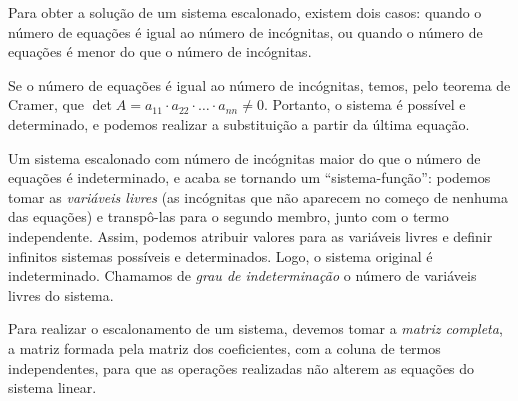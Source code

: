 Para obter a solução de um sistema escalonado, existem dois casos: quando o número de equações é igual ao número de incógnitas, ou quando o número de equações é menor do que o número de incógnitas. \par 
Se o número de equações é igual ao número de incógnitas, temos, pelo teorema de Cramer, que $\det A= a_{11}\cdot a_{22}\cdot \dots \cdot a_{nn} \neq 0$. Portanto, o sistema é possível e determinado, e podemos realizar a substituição a partir da última equação. \par 
Um sistema escalonado com número de incógnitas maior  do que o número de equações é indeterminado, e acaba se tornando um ``sistema-função'': podemos tomar as \emph{variáveis livres} (as incógnitas que não aparecem no começo de nenhuma das equações) e transpô-las para o segundo membro, junto com o termo independente. Assim, podemos atribuir valores para as variáveis livres e definir infinitos sistemas possíveis e determinados. Logo, o sistema original é indeterminado. Chamamos de \emph{grau de indeterminação} o número de variáveis livres do sistema.\par 
Para realizar o escalonamento de um sistema, devemos tomar a \emph{matriz completa}, a matriz formada pela matriz dos coeficientes, com a coluna de termos independentes, para que as operações realizadas não alterem as equações do sistema linear.
